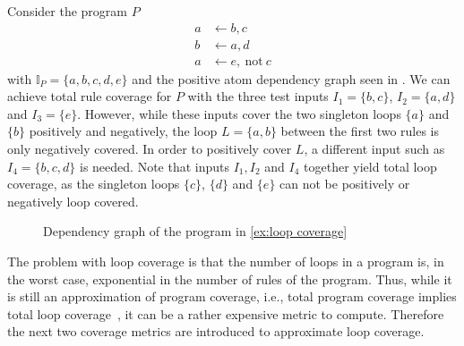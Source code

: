 \begin{example}
\label{ex:loop coverage}
    Consider the program $P$
    \begin{align*}
        a &\leftarrow b, c \\
        b &\leftarrow a, d \\
        a &\leftarrow e,\ \text{not}\ c
    \end{align*}
    with \(\mathbb{I}_P = \{a, b, c, d, e\}\) and the positive atom dependency graph seen in . We can achieve total rule coverage for $P$ with the three test inputs \(I_1 = \{b, c\}\), \(I_2 = \{a, d\}\) and \(I_3 = \{e\}\). However, while these inputs cover the two singleton loops \(\{a\}\) and \(\{b\}\) positively and negatively, the loop \(L = \{a, b\}\) between the first two rules is only negatively covered. In order to positively cover $L$, a different input such as \(I_4 = \{b, c, d\}\) is needed.
    Note that inputs \(I_1, I_2\) and \(I_4\) together yield total loop coverage, as the singleton loops \(\{c\}\), \(\{d\}\) and \(\{e\}\) can not be positively or negatively loop covered.
\end{example}

\begin{figure}[h]
    \centering
    \caption{Dependency graph of the program in \cref{ex:loop coverage}}
    \label{fig:dependency graph loop}
\end{figure}

The problem with loop coverage is that the number of loops in a program is, in the worst case, exponential in the number of rules of the program. Thus, while it is still an approximation of program coverage, i.e., total program coverage implies total loop coverage~\cite{Jan+10}, it can be a rather expensive metric to compute. Therefore the next two coverage metrics are introduced to approximate loop coverage.

